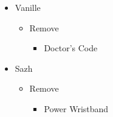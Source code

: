 \begin{paracol}{2}
\switchcolumn
\begin{menu}
\begin{itemize}
    \equip
    \begin{itemize}
        \item Vanille
        \begin{itemize}
            \item Remove
            \begin{itemize}
                \item Doctor's Code
            \end{itemize}
        \end{itemize}
        \item Sazh
        \begin{itemize}
            \item Remove
            \begin{itemize}
                \item Power Wristband
            \end{itemize}
        \end{itemize}
    \end{itemize}
\end{itemize}
\end{menu}
\end{paracol}
